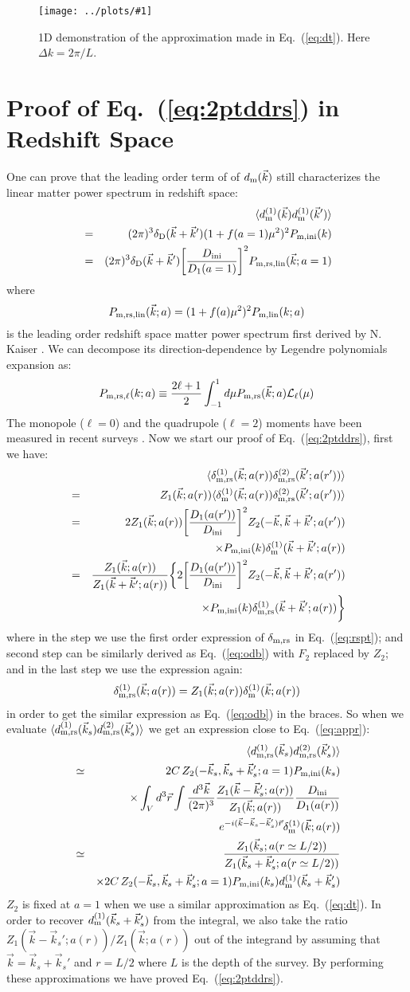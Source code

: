 \documentclass[prd,amsmath,amssymb,floatfix,superscriptaddress,nofootinbib,twocolumn]{revtex4-1}
\def\be{\begin{equation}}
\def\ee{\end{equation}}
\def\bea{\begin{eqnarray}}
\def\eea{\end{eqnarray}}
\newcommand{\rs}{\rm rs}
\newcommand{\ini}{\rm ini}
\newcommand{\vrr}{\vec{r}}
\newcommand{\vs}{\nonumber\\}
\newcommand{\vk}{\vec{k}}
\newcommand{\ec}[1]{Eq.~(\ref{eq:#1})}
\newcommand{\eql}[1]{\label{eq:#1}}
\newcommand{\sfig}[2]{
\texttt{[image: ../plots/\#1]}
        }
\newcommand{\Sfig}[2]{
   \begin{figure}[thbp]
   \begin{center}
    \sfig{../plots/#1.pdf}{\columnwidth}
    \caption{{\small #2}}
    \label{fig:#1}
     \end{center}
   \end{figure}
}
\begin{document}
\Sfig{approx}{1D demonstration of the approximation made in \ec{dt}. Here $\Delta k=2\pi /L$.}
\section{Proof of \ec{2ptddrs} in Redshift Space} \label{appendb}
One can prove that the leading order term of of $d_{\rm m}(\vk)$ still characterizes the linear matter power spectrum in redshift space:
\bea 
&&\langle d^{( 1)}_{\rm m}(\vk) d^{(1)}_{\rm m}(\vk') \rangle\vs
& = &(2\pi)^3 \delta_{\rm D}(\vk+\vk')(1+f(a=1)\mu^2)^2 P_{\rm m,ini}(k)\vs
&= &(2\pi)^3 \delta_{\rm D}(\vk+\vk')\bigg[ \frac{D_{\ini}}{D_1(a=1)}\bigg]^2 P_{\rm m,rs,lin}(\vk;a=1)\vs \eql{lpsrs}
\eea 
where 
\be 
P_{\rm m,rs,lin}(\vk;a)=(1+f(a)\mu^2)^2 P_{\rm m,lin}(k;a) \eql{kaiser}
\ee 
is the leading order redshift space matter power spectrum first derived by N. Kaiser \cite{Kaiser:1987rsd}. We can decompose its direction-dependence by Legendre polynomials expansion as:
\be 
P_{\rm m,rs,\ell}(k;a)\equiv \frac{2\ell+1}{2}\int_{-1}^{1}d\mu P_{\rm m,rs}(\vk;a) \mathcal{L}_{\ell}(\mu)
\ee 
The monopole ($\ell=0$) and the quadrupole ($\ell=2$) moments have been measured in recent surveys \cite{Gil-Marin:2015sqa}. Now we start our proof of \ec{2ptddrs}, first we have:
\bea 
&&\langle \delta_{\rm m,\rs}^{(1)}(\vk;a(r))\delta_{\rm m,\rs}^{(2)}(\vk';a(r'))\rangle\vs 
&=&Z_{1}(\vk;a(r))\langle \delta_{\rm m}^{(1)}(\vk;a(r))\delta_{\rm m,\rs}^{(2)}(\vk';a(r'))\rangle\vs 
&=&2Z_{1}(\vk;a(r))\bigg[\frac{D_{1}(a(r'))}{D_{\ini}} \bigg]^{2}Z_{2}(-\vk,\vk+\vk';a(r'))\vs
&& \times P_{\rm m,\ini}(k)\delta_{\rm m}^{(1)}(\vk+\vk';a(r))\vs 
&=&\frac{Z_{1}(\vk;a(r))}{Z_{1}(\vk+\vk';a(r))}\bigg\{2\bigg[\frac{D_{1}(a(r'))}{D_{\ini}} \bigg]^{2}Z_{2}(-\vk,\vk+\vk';a(r')) \vs
&& \times P_{\rm m,\ini}(k)\delta_{\rm m,\rs}^{(1)}(\vk+\vk';a(r))\bigg\}
\eea 
where in the step we use the first order expression of $\delta_{\rm m, \rs}$ in \ec{rspt}; and second step can be similarly derived as \ec{odb} with $F_2$ replaced by $Z_2$; and in the last step we use the expression again:
\be 
\delta_{\rm m,\rs}^{(1)}(\vk;a(r))=Z_{1}(\vk;a(r))\delta_{\rm m}^{(1)}(\vk;a(r))
\ee 
in order to get the similar expression as \ec{odb} in the braces. So when we evaluate $\langle d_{\rm m,\rs}^{(1)}(\vk_s) d_{\rm m,\rs}^{(2)}(\vk'_s)\rangle$ we get an expression close to \ec{appr}:
\bea 
&& \langle d^{(1)}_{\rm m,\rs}(\vk_s)d^{(2)}_{\rm m,\rs}(\vk_s') \rangle \vs 
&\simeq & 2C\,Z_{2}(-\vk_s,\vk_s+\vk_s';a=1)P_{\rm m,\ini}(k_s) \vs
&& \times \int_{V} d^{3} \vrr\int \frac{d^{3}\vk}{(2\pi)^3}\frac{Z_{1}(\vk-\vk_s';a(r))}{Z_{1}(\vk;a(r))}\frac{D_{\ini}}{D_{1}(a(r))}\vs
&&\qquad e^{-i(\vk-\vk_s-\vk_s')\vrr}\delta_{\rm m}^{(1)}(\vk;a(r))\vs
&\simeq & \frac{Z_{1}(\vk_s;a(r\simeq L/2 ) )}{Z_{1}(\vk_s+\vk_s';a(r\simeq L/2 ))} \vs 
&&\times2C\,Z_{2}(-\vk_s,\vk_s+\vk_s';a=1) P_{\rm m,\ini}(k_s)d_{\rm m}^{(1)}(\vk_s+\vk_s') \vs\eql{apprrs}
\eea 
$Z_2$ is fixed at $a=1$ when we use a similar approximation as \ec{dt}. In order to recover $d_{\rm m}^{(1)}(\vk_s+\vk_s')$ from the integral, we also take the ratio ${Z_{1}(\vk-\vk_s';a(r))}/{Z_{1}(\vk;a(r))}$ out of the integrand by assuming that $\vk=\vk_s+\vk_s'$ and $r=L/2$ where $L$ is the depth of the survey. By performing these approximations we have proved \ec{2ptddrs}.
\end{document}
